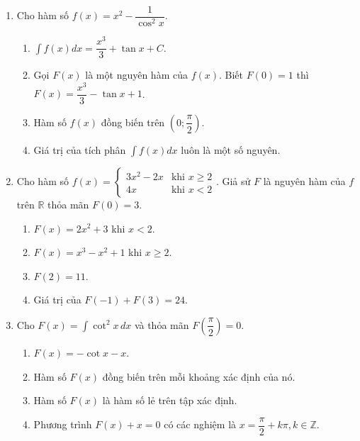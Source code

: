 \documentclass[12pt]{article}
\begin{document}
\begin{enumerate}[label=\textbf{Câu \arabic*.}, start=1]
		\item Cho hàm số $f(x) = x^2 - \dfrac{1}{\cos^2 x}$.
		\begin{enumerate}[label=\alph*)]
			\item $\displaystyle \int f(x) dx = \dfrac{x^3}{3} + \tan x + C$.
			\item Gọi $F(x)$ là một nguyên hàm của $f(x)$. Biết $F(0) = 1$ thì $F(x) = \dfrac{x^3}{3} - \tan x + 1$.
			\item Hàm số $f(x)$ đồng biến trên $\left(0; \dfrac{\pi}{2}\right)$.
			\item Giá trị của tích phân $\displaystyle \int f(x) dx$ luôn là một số nguyên.
		\end{enumerate}
		
		\item Cho hàm số $f(x) = \begin{cases} 3x^2 - 2x & \text{khi } x \ge 2 \\ 4x & \text{khi } x < 2 \end{cases}$. Giả sử $F$ là nguyên hàm của $f$ trên $\mathbb{R}$ thỏa mãn $F(0) = 3$.
		\begin{enumerate}[label=\alph*)]
			\item $F(x) = 2x^2 + 3$ khi $x < 2$.
			\item $F(x) = x^3 - x^2 + 1$ khi $x \ge 2$.
			\item $F(2) = 11$.
			\item Giá trị của $F(-1) + F(3) = 24$.
		\end{enumerate}
		
		
		\item Cho $\displaystyle F(x) = \int \cot^2 x \,dx$ và thỏa mãn $F\left(\dfrac{\pi}{2}\right) = 0$.
		\begin{enumerate}[label=\alph*)]
			\item $F(x) = -\cot x - x$.
			\item Hàm số $F(x)$ đồng biến trên mỗi khoảng xác định của nó.
			\item Hàm số $F(x)$ là hàm số lẻ trên tập xác định.
			\item Phương trình $F(x) + x = 0$ có các nghiệm là $x = \dfrac{\pi}{2} + k\pi, k \in \mathbb{Z}$.
		\end{enumerate}
		

\end{enumerate}
\end{document}

